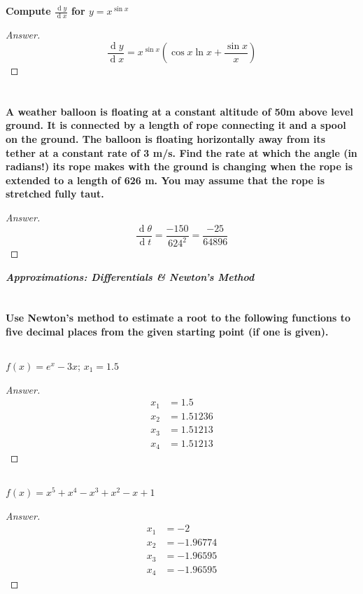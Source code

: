 \documentclass[english]{article}
\renewcommand{\d}[1]{\ensuremath{\operatorname{d}\!{#1}}}
\newcommand{\dydx}[2]{\frac{\d #1}{\d #2}}
\newcommand{\prob}[1]{\setcounter{section}{#1-1}\section{}}
\newcommand{\prt}[1]{\setcounter{subsection}{#1-1}\subsection{}}
\theoremstyle{remark}
\theoremstyle{definition}
\begin{document}
	\prob{3}
\textbf{Compute $\dydx{y}{x}$ for $y=x^{\sin{x}}$}
\begin{proof}[Answer]
	$$\dydx{y}{x}=x^{\sin x}\left(\cos x \ln x +\frac{\sin x}{x}\right)$$
\end{proof}
\prob{4} \textbf{A weather balloon is floating at a constant altitude of 50m above level ground. It is connected by a length of rope connecting it and a spool on the ground. The balloon is floating horizontally away from its tether at a constant rate of 3 m/s. Find the rate at which the angle (in radians!) its rope makes with the ground is changing when the rope is extended to a length of 626 m. You may assume that the rope is stretched fully taut.}\begin{proof}[Answer]
$$\dydx{\theta}{t}=\frac{-150}{624^2}=\frac{-25}{64896}$$
\end{proof}
		\begin{center}{\Large\textbf{\emph{Approximations: Differentials \& Newton's Method}}}\end{center}
		\prob{5} \textbf{Use Newton's method to estimate a root to the following functions to five decimal places from the given starting point (if one is given).}
		\prt{1} $f(x)=e^x-3x$; $x_1=1.5$
		\begin{proof}[Answer]
				\begin{align*}
	x_1&=	1.5\\x_2&= 1.51236\\x_3&= 1.51213\\ x_4&=1.51213
	\end{align*}
			\end{proof}
		\prt{2} $f(x)=x^5+x^4-x^3+x^2-x+1$\begin{proof}[Answer]
			\begin{align*}
			x_1&=	-2\\x_2&= -1.96774\\x_3&= -1.96595\\ x_4&=-1.96595
			\end{align*}
		\end{proof}
	
\end{document}
